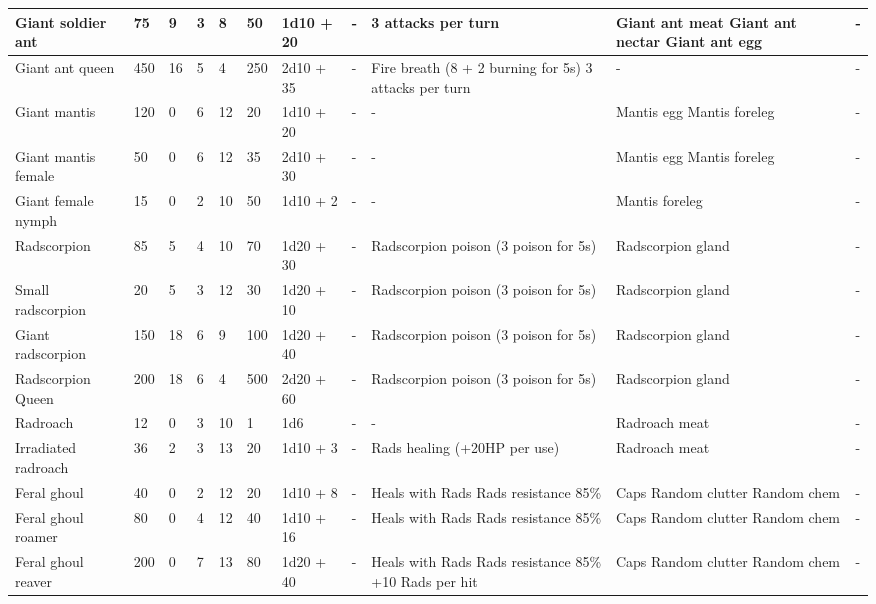 \begin{longtable}{|p{2.5cm}|p{0.6cm}|p{0.6cm}|p{0.6cm}|p{0.6cm}|p{0.6cm}|p{1.5cm}|p{4cm}|p{4cm}|p{4cm}|p{2.3cm}|}
\hline
Giant soldier ant & 75 & 9 & 3 & 8 & 50 & 1d10 + 20 & - & 3 attacks per turn & Giant ant meat \newline Giant ant nectar \newline Giant ant egg & - \\
\hline
Giant ant queen & 450 & 16 & 5 & 4 & 250 & 2d10 + 35 & - & Fire breath (8 + 2 burning for 5s) 3 attacks per turn & - & - \\
\hline
Giant mantis & 120 & 0 & 6 & 12 & 20 & 1d10 + 20 & - & - & Mantis egg Mantis foreleg & - \\
\hline
Giant mantis female & 50 & 0 & 6 & 12 & 35 & 2d10 + 30 & - & - & Mantis egg Mantis foreleg & - \\
\hline
Giant female nymph & 15 & 0 & 2 & 10 & 50 & 1d10 + 2 & - & - & Mantis foreleg & - \\
\hline
Radscorpion & 85 & 5 & 4 & 10 & 70 & 1d20 + 30 & - & Radscorpion poison (3 poison for 5s) & Radscorpion gland & - \\
\hline
Small radscorpion & 20 & 5 & 3 & 12 & 30 & 1d20 + 10 & - & Radscorpion poison (3 poison for 5s) & Radscorpion gland & - \\
\hline
Giant radscorpion & 150 & 18 & 6 & 9 & 100 & 1d20 + 40 & - & Radscorpion poison (3 poison for 5s) & Radscorpion gland & - \\
\hline
Radscorpion Queen & 200 & 18 & 6 & 4 & 500 & 2d20 + 60 & - & Radscorpion poison (3 poison for 5s) & Radscorpion gland & - \\
\hline
Radroach & 12 & 0 & 3 & 10 & 1 & 1d6 & - & - & Radroach meat & - \\
\hline
Irradiated radroach & 36 & 2 & 3 & 13 & 20 & 1d10 + 3 & - & Rads healing (+20HP per use) & Radroach meat & - \\
\hline
Feral ghoul & 40 & 0 & 2 & 12 & 20 & 1d10 + 8 & - & Heals with Rads \newline Rads resistance 85\% & Caps \newline Random clutter \newline Random chem & - \\
\hline
Feral ghoul roamer & 80 & 0 & 4 & 12 & 40 & 1d10 + 16 & - & Heals with Rads \newline Rads resistance 85\% & Caps \newline Random clutter \newline Random chem & - \\
\hline
Feral ghoul reaver & 200 & 0 & 7 & 13 & 80 & 1d20 + 40 & - & Heals with Rads \newline Rads resistance 85\% \newline +10 Rads per hit & Caps \newline Random clutter \newline Random chem & - \\

\end{longtable}
